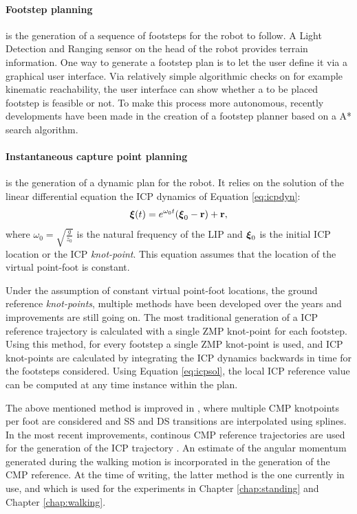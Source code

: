\paragraph{Footstep planning} is the generation of a sequence of footsteps for the robot to follow. A Light Detection and Ranging sensor on the head of the robot provides terrain information. One way to generate a footstep plan is to let the user define it via a graphical user interface. Via relatively simple algorithmic checks on for example kinematic reachability, the user interface can show whether a to be placed footstep is feasible or not. To make this process more autonomous, recently developments have been made in the creation of a footstep planner based on a A* search algorithm. 
\paragraph{Instantaneous capture point planning}\label{subsec:icpplan} is the generation of a dynamic plan for the robot. It relies on the solution of the linear differential equation the \ac{ICP} dynamics of Equation \ref{eq:icpdyn}:
\begin{equation}\label{eq:icpsol}
	\boldsymbol{\xi}(t)=e^{\omega_0t}(\boldsymbol{\xi}_0- \mathbf{r}) + \mathbf{r},
\end{equation}
where $\omega_0=\sqrt{\frac{g}{z_0}}$ is the natural frequency of the \ac{LIP} and $\boldsymbol{\xi}_0$ is the initial \ac{ICP} location or the \ac{ICP} \textit{knot-point}. This equation assumes that the location of the virtual point-foot is constant. 

Under the assumption of constant virtual point-foot locations, the ground reference \textit{knot-points}, multiple methods have been developed over the years and improvements are still going on. The most traditional generation of a \ac{ICP} reference trajectory is calculated with a single \ac{ZMP} knot-point \cite{englsberger2012integration} for each footstep. Using this method, for every footstep a single \ac{ZMP} knot-point is used, and \ac{ICP} knot-points are calculated by integrating the \ac{ICP} dynamics backwards in time for the footsteps considered. Using Equation \ref{eq:icpsol}, the local \ac{ICP} reference value can be computed at any time instance within the plan. 

The above mentioned method is improved in \cite{englsberger2014trajectory}, where multiple \ac{CMP} knotpoints per foot are considered and \ac{SS} and \ac{DS} transitions are interpolated using splines. In the most recent improvements, continous \ac{CMP} reference trajectories are used for the generation of the \ac{ICP} trajectory \cite{seyde2018inclusion}. An estimate of the angular momentum generated during the walking motion is incorporated in the generation of the \ac{CMP} reference. At the time of writing, the latter method is the one currently in use, and which is used for the experiments in Chapter \ref{chap:standing} and Chapter \ref{chap:walking}.
